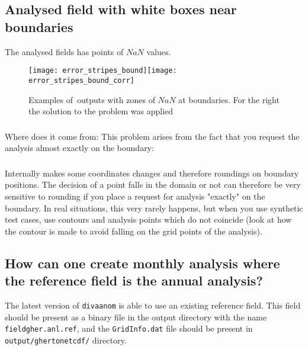 \subsection{Analysed field with white boxes near boundaries}

The analysed fields has points of $NaN$ values.

\begin{figure}[htpb]
\centering
\texttt{[image: error\_stripes\_bound]}\texttt{[image: error\_stripes\_bound\_corr]}
\caption{Examples of \diva\,outputs with zones of $NaN$ at boundaries. For the right the solution to the problem was applied \label{fig:error_stripes}}
\end{figure}

\subsubsection{\question}
Where does it come from: This problem arises from the fact that you request the analysis almost exactly on the boundary: 



\subsubsection{\answer}
Internally \diva makes some coordinates changes and therefore roundings on boundary positions. The decision of a point falls in the domain or not can therefore be very sensitive
to rounding if you place a request for analysis "exactly" on the boundary. In real situations, this very rarely happens, but when you use synthetic test cases, use contours and analysis points which do not coincide (look at  how the contour is made to avoid falling on the grid points of the analysis).




\subsection{How can one create monthly analysis where the reference field is the annual analysis?}


The latest version of \texttt{divaanom} is able to use an existing reference field. This field should be present as a binary file in the output directory with the name \texttt{fieldgher.anl.ref}, and the \texttt{GridInfo.dat} file should be present in \texttt{output/ghertonetcdf/} directory.

